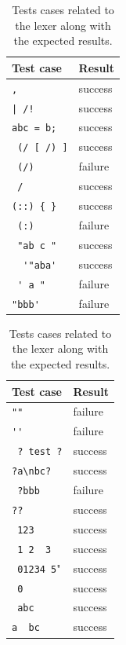 \documentclass[english,engineering]{wizthesis}
\begin{document}
\begin{table}[H]
  \centering
  \caption{Tests cases related to the lexer along with the expected results.}
  \label{tab:lexer-test-cases}
  \begin{tabular}{@{}ll@{}}
    \toprule
    Test case & Result \\ \midrule
    \verb*@,@                    & success \\
    \verb*@| /!@                 & success \\
    \verb*@abc = b;@             & success \\
    \verb*@ (/ [ /) ]@           & success \\
    \verb*@ (/) @                & failure \\
    \verb*@ /@                   & success \\
    \verb*@(::) { } @            & success \\
    \verb*@ (:) @                & failure \\
    \verb*@ "ab c " @            & success \\
    \verb*@  '"aba' @            & success \\
    \verb*@ ' a "@               & failure \\
    \verb*@"bbb'   @             & failure \\ \bottomrule
  \end{tabular}
  \hspace{0.5cm}
  \begin{tabular}{@{}ll@{}}
    \toprule
    Test case & Result \\ \midrule
    \verb*@""@                   & failure \\
    \verb*@''@                   & failure \\
    \verb*@ ? test ?@            & success \\
    \verb*@?a\nbc?  @            & success \\
    \verb*@ ?bbb  @              & failure \\
    \verb*@??@                   & success \\
    \verb*@ 123 @                & success \\
    \verb*@ 1 2  3  @            & success \\
    \verb*@ 01234 5@"            & success \\
    \verb*@ 0 @                  & success \\
    \verb*@ abc @                & success \\
    \verb*@a  bc @               & success \\ \bottomrule

\end{tabular}
\end{table}
\end{document}
